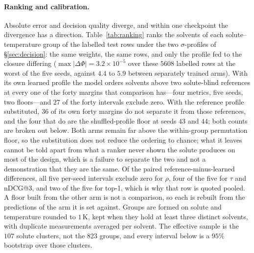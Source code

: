 \paragraph{Ranking and calibration.} Absolute error and decision quality diverge, and within one
checkpoint the divergence has a direction. Table~\ref{tab:ranking} ranks the solvents of each
solute--temperature group of the labelled test rows under the two $\sigma$-profiles of
\S\ref{sec:decision}: the same weights, the same rows, and only the profile fed to the closure
differing ($\max|\Delta\Phi|=3.2\times10^{-5}$ over these $5608$ labelled rows at the worst of the
five seeds, against $4.4$ to
$5.9$ between separately trained arms). With its own learned profile the model orders solvents above
two solute-blind references at every one of the forty margins that comparison has---four
metrics, five seeds, two floors---and $27$ of the forty intervals exclude zero. With the reference
profile substituted, $36$ of its own forty margins do not separate it from those references, and the
four that do are the shuffled-profile floor at seeds $43$ and $44$; both counts are broken out
below. Both arms remain far above the
within-group permutation floor, so the substitution does not reduce the ordering to chance; what it
leaves cannot be told apart from what a ranker never shown the solute produces on most of the
design, which is a failure
to separate the two and not a demonstration that they are the same. Of the paired
reference-minus-learned differences, all five per-seed intervals exclude zero for $\rho$, four of the
five for $\tau$ and nDCG@3, and two of the five for top-1, which is why that row is quoted pooled. A floor
built from the other arm is not a comparison, so each is rebuilt from the predictions of the arm it
is set against. Groups are formed on solute
and temperature rounded to $1$\,K, kept when they hold at least three distinct solvents, with
duplicate measurements averaged per solvent. The effective
sample is the $107$ solute clusters, not the $823$ groups, and every interval below is a $95\%$
bootstrap over those clusters.

